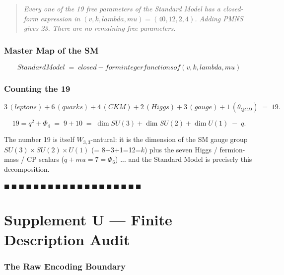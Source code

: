 \documentclass[12pt,a4paper]{article}
\def\mathrm#1{#1}%
\def\text#1{#1}%
\def\lambda{lambda}%
\def\mu{mu}%
\def\Phi#1{Phi#1}%
\theoremstyle{definition}
\newcommand{\SU}{\mathrm{SU}}
\begin{document}
\begin{quote}\em
Every one of the 19 free parameters of the Standard Model has a
closed-form expression in $(v,k,\lambda,\mu)=(40,12,2,4)$. Adding
PMNS gives 23. There are no remaining free parameters.
\end{quote}

\section*{Master Map of the SM}

\[
\boxed{\;\text{Standard Model}\;=\;\text{closed-form integer functions of }(v,k,\lambda,\mu)\;}
\]

\section*{Counting the 19}

\[
3\,(\text{leptons}) + 6\,(\text{quarks}) + 4\,(\text{CKM}) + 2\,(\text{Higgs}) + 3\,(\text{gauge}) + 1\,(\theta_{QCD}) \;=\; 19.
\]

\[
19 = q^2 + \Phi_4 \;=\; 9+10 \;=\; \dim\SU(3)+\dim\SU(2)+\dim\mathrm{U}(1) \;-\; q.
\]

The number 19 is itself $W_{3,3}$-natural: it is the dimension of
the SM gauge group $\SU(3)\times\SU(2)\times\mathrm{U}(1)$ (= 8+3+1=12=$k$)
plus the seven Higgs / fermion-mass / CP scalars ($q + \mu = 7 = \Phi_6$)
... and the Standard Model is precisely this decomposition.

\hfill $\blacksquare\ \blacksquare\ \blacksquare\ \blacksquare\ \blacksquare\ \blacksquare\ \blacksquare\ \blacksquare\ \blacksquare\ \blacksquare\ \blacksquare\ \blacksquare\ \blacksquare\ \blacksquare\ \blacksquare\ \blacksquare\ \blacksquare\ \blacksquare\ \blacksquare$

\clearpage
\part*{Supplement U --- Finite Description Audit}

\section*{The Raw Encoding Boundary}
\end{document}
